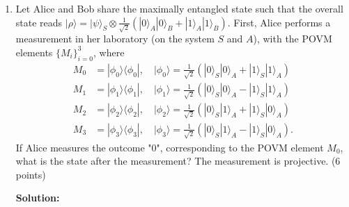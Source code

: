 \documentclass[12pt]{article}
\begin{document}
\begin{enumerate}
    \item Let Alice and Bob share the maximally entangled state such that the overall state reads $|\rho\rangle = |\psi\rangle_S \otimes \frac{1}{\sqrt{2}}(|0\rangle_A|0\rangle_B + |1\rangle_A|1\rangle_B)$. First, Alice performs a measurement in her laboratory (on the system $S$ and $A$), with the POVM elements $\{M_i\}_{i=0}^3$, where
          \begin{align*}
              M_0 & = |\phi_0\rangle\langle\phi_0|, \quad |\phi_0\rangle = \frac{1}{\sqrt{2}}(|0\rangle_S|0\rangle_A + |1\rangle_S|1\rangle_A)  \\
              M_1 & = |\phi_1\rangle\langle\phi_1|, \quad |\phi_1\rangle = \frac{1}{\sqrt{2}}(|0\rangle_S|0\rangle_A - |1\rangle_S|1\rangle_A)  \\
              M_2 & = |\phi_2\rangle\langle\phi_2|, \quad |\phi_2\rangle = \frac{1}{\sqrt{2}}(|0\rangle_S|1\rangle_A + |1\rangle_S|0\rangle_A)  \\
              M_3 & = |\phi_3\rangle\langle\phi_3|, \quad |\phi_3\rangle = \frac{1}{\sqrt{2}}(|0\rangle_S|1\rangle_A - |1\rangle_S|0\rangle_A).
          \end{align*}
          If Alice measures the outcome "0", corresponding to the POVM element $M_0$, what is the state after the measurement? The measurement is projective. (6 points)

          \textbf{Solution:}




\end{enumerate}
\end{document}
